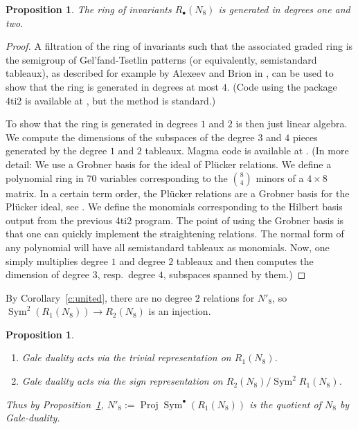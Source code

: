 \documentclass{amsart}
\newcommand{\cut}[1]{}
\newtheorem{proposition}[theorem]{Proposition}
\theoremstyle{definition}
\theoremstyle{remark}
\DeclareMathOperator{\Proj}{Proj}
\DeclareMathOperator{\Sym}{Sym}
\begin{document}
\begin{proposition}
The ring of invariants $R_{\bullet}(N_8)$ is generated in degrees
  one and two.\label{browncow}
\end{proposition}

\begin{proof}
A filtration of the ring of invariants such that the associated graded ring is the semigroup of Gel'fand-Tsetlin patterns (or
equivalently,
semistandard tableaux), as described for example by Alexeev and Brion
in \cite[\S 5.1]{ab}\cut{in Gonciulea-Lakshmibai, Caldero,
Alexeev-Brion, or Foth-Hu}, can be used to show that the ring is
generated in degrees at most $4$.  (Code using the package 4ti2 is available at
\cite{hmsvcode},
 but the method is standard.)  

To show that the ring is  generated in degrees $1$ and $2$ is
then just linear algebra.  We compute the dimensions of the subspaces
of the degree $3$ and $4$ pieces generated by the degree $1$ and $2$ tableaux.  
Magma code is available 
at  \cite{hmsvcode}.
(In more detail: We use a Grobner basis
for the ideal of Pl\"ucker relations.  We define a polynomial ring in 70
variables corresponding to the $\binom 8 4$ minors of a $4 \times 8$
matrix.  In a certain term order, the Pl\"ucker relations are a Grobner
basis for the Pl\"ucker ideal, see \cite[Thm.~14.6, p.~277]{ms}.  We define the monomials corresponding to the Hilbert basis
output from the previous 4ti2 program.   The point of using the
Grobner basis is that one can quickly implement the straightening
relations.  The normal form of any polynomial will have all
semistandard tableaux as monomials.   Now, one simply multiplies degree
$1$ and degree $2$ tableaux and then computes the dimension of degree
$3$, resp.\ degree $4$, subspaces spanned by them.)
\end{proof}

By Corollary~\ref{c:united},  there are no degree $2$ relations
for $N'_8$, so $\Sym^2(R_1(N_8)) \rightarrow R_2(N_8)$ is an injection.

\begin{proposition} $\quad$
\begin{enumerate}
\item[(a)] Gale duality acts via the trivial representation on $R_1(N_8)$.
\item[(b)] Gale duality acts via the sign representation on $R_2(N_8) /
\Sym^2 R_1(N_8)$.
\end{enumerate}
Thus by Proposition~\ref{browncow}, $N'_8 := \Proj \Sym^{\bullet} (R_1(N_8))$ is the quotient of $N_8$ by Gale-duality.\label{anotherbrowncow}
\end{proposition}
\end{document}
